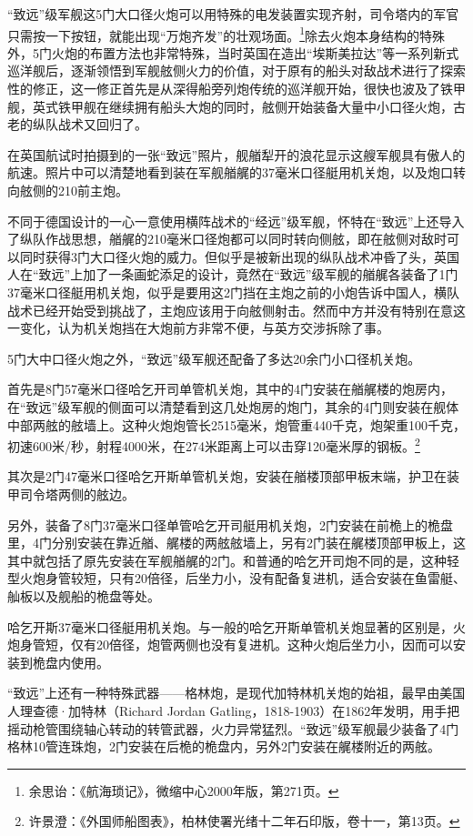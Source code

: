 \documentclass[12pt,UTF8]{ctexbook}
\begin{document}
“致远”级军舰这5门大口径火炮可以用特殊的电发装置实现齐射，司令塔内的军官只需按一下按钮，就能出现“万炮齐发”的壮观场面。\footnote{余思诒：《航海琐记》，微缩中心2000年版，第271页。}除去火炮本身结构的特殊外，5门火炮的布置方法也非常特殊，当时英国在造出“埃斯美拉达”等一系列新式巡洋舰后，逐渐领悟到军舰舷侧火力的价值，对于原有的船头对敌战术进行了探索性的修正，这一修正首先是从深得船旁列炮传统的巡洋舰开始，很快也波及了铁甲舰，英式铁甲舰在继续拥有船头大炮的同时，舷侧开始装备大量中小口径火炮，古老的纵队战术又回归了。

在英国航试时拍摄到的一张“致远”照片，舰艏犁开的浪花显示这艘军舰具有傲人的航速。照片中可以清楚地看到装在军舰艏艉的37毫米口径艇用机关炮，以及炮口转向舷侧的210前主炮。

不同于德国设计的一心一意使用横阵战术的“经远”级军舰，怀特在“致远”上还导入了纵队作战思想，艏艉的210毫米口径炮都可以同时转向侧舷，即在舷侧对敌时可以同时获得3门大口径火炮的威力。但似乎是被新出现的纵队战术冲昏了头，英国人在“致远”上加了一条画蛇添足的设计，竟然在“致远”级军舰的艏艉各装备了1门37毫米口径艇用机关炮，似乎是要用这2门挡在主炮之前的小炮告诉中国人，横队战术已经开始受到挑战了，主炮应该用于向舷侧射击。然而中方并没有特别在意这一变化，认为机关炮挡在大炮前方非常不便，与英方交涉拆除了事。

5门大中口径火炮之外，“致远”级军舰还配备了多达20余门小口径机关炮。

首先是8门57毫米口径哈乞开司单管机关炮，其中的4门安装在艏艉楼的炮房内，在“致远”级军舰的侧面可以清楚看到这几处炮房的炮门，其余的4门则安装在舰体中部两舷的舷墙上。这种火炮炮管长2515毫米，炮管重440千克，炮架重100千克，初速600米/秒，射程4000米，在274米距离上可以击穿120毫米厚的钢板。\footnote{许景澄：《外国师船图表》，柏林使署光绪十二年石印版，卷十一，第13页。}

其次是2门47毫米口径哈乞开斯单管机关炮，安装在艏楼顶部甲板末端，护卫在装甲司令塔两侧的舷边。

另外，装备了8门37毫米口径单管哈乞开司艇用机关炮，2门安装在前桅上的桅盘里，4门分别安装在靠近艏、艉楼的两舷舷墙上，另有2门装在艉楼顶部甲板上，这其中就包括了原先安装在军舰艏艉的2门。和普通的哈乞开司炮不同的是，这种轻型火炮身管较短，只有20倍径，后坐力小，没有配备复进机，适合安装在鱼雷艇、舢板以及舰船的桅盘等处。

哈乞开斯37毫米口径艇用机关炮。与一般的哈乞开斯单管机关炮显著的区别是，火炮身管短，仅有20倍径，炮管两侧也没有复进机。这种火炮后坐力小，因而可以安装到桅盘内使用。

“致远”上还有一种特殊武器——格林炮，是现代加特林机关炮的始祖，最早由美国人理查德·加特林（Richard Jordan Gatling，1818-1903）在1862年发明，用手把摇动枪管围绕轴心转动的转管武器，火力异常猛烈。“致远”级军舰最少装备了4门格林10管连珠炮，2门安装在后桅的桅盘内，另外2门安装在艉楼附近的两舷。
\end{document}
